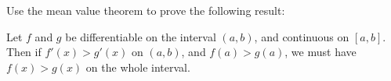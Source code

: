 \documentclass{ximera}
\author{Steven Gubkin}
\begin{document}
\begin{exercise}



Use the mean value theorem to prove the following result:

\begin{theorem}
	Let $f$ and $g$ be differentiable on the interval $(a,b)$, and continuous on $[a,b]$. Then if $f'(x)>g'(x)$ on $(a,b)$, and $f(a)>g(a)$, we must have $f(x)>g(x)$ on the whole interval.
\end{theorem}

\end{exercise}
\end{document}
